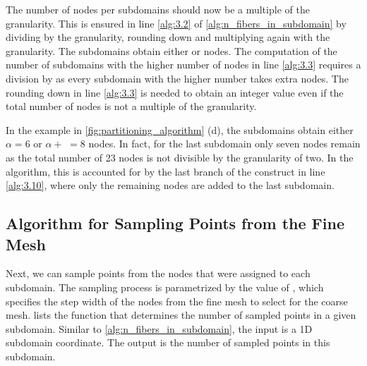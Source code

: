 The number of nodes per subdomains should now be a multiple of the granularity. This is ensured in line \ref{alg:3.2} of \cref{alg:n_fibers_in_subdomain} by dividing by the granularity, rounding down and multiplying again with the granularity. The subdomains obtain either \code{$\alpha$} or  nodes. The computation of the number  of subdomains with the higher number of nodes in line \ref{alg:3.3} requires a division by  as every subdomain with the higher number takes  extra nodes. The rounding down in line \ref{alg:3.3} is needed to obtain an integer value even if the total number of nodes is not a multiple of the granularity.

In the example in \cref{fig:partitioning_algorithm} (d), the subdomains obtain either $\alpha=6$ or $\alpha +$ $=8$ nodes. In fact, for the last subdomain only seven nodes remain as the total number of 23 nodes is not divisible by the granularity of two.
In the algorithm, this is accounted for by the last branch of the  construct in line \ref{alg:3.10}, where only the remaining nodes are added to the last subdomain.

\subsection{Algorithm for Sampling Points from the Fine Mesh}\label{sec:partitioning_alg2}

Next, we can sample points from the nodes that were assigned to each subdomain. The sampling process is parametrized by the value of , which specifies the step width of the nodes from the fine mesh to select for the coarse mesh.
 lists the function that determines the number of sampled points in a given subdomain. Similar to \cref{alg:n_fibers_in_subdomain}, the input is a 1D subdomain coordinate. The output is the number of sampled points in this subdomain.

